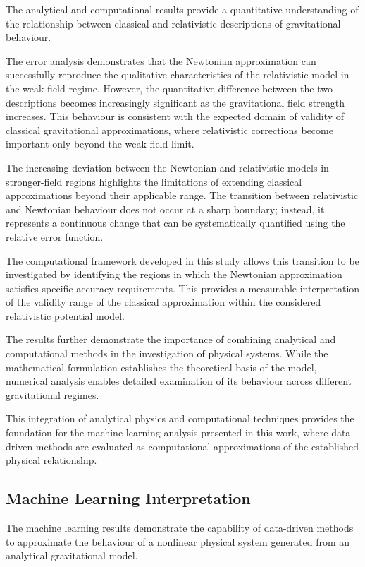 \documentclass[
]{article}
\begin{document}
The analytical and computational results provide a quantitative
understanding of the relationship between classical and relativistic
descriptions of gravitational behaviour.

The error analysis demonstrates that the Newtonian approximation can
successfully reproduce the qualitative characteristics of the
relativistic model in the weak-field regime. However, the quantitative
difference between the two descriptions becomes increasingly significant
as the gravitational field strength increases. This behaviour is
consistent with the expected domain of validity of classical
gravitational approximations, where relativistic corrections become
important only beyond the weak-field limit.

The increasing deviation between the Newtonian and relativistic models
in stronger-field regions highlights the limitations of extending
classical approximations beyond their applicable range. The transition
between relativistic and Newtonian behaviour does not occur at a sharp
boundary; instead, it represents a continuous change that can be
systematically quantified using the relative error function.

The computational framework developed in this study allows this
transition to be investigated by identifying the regions in which the
Newtonian approximation satisfies specific accuracy requirements. This
provides a measurable interpretation of the validity range of the
classical approximation within the considered relativistic potential
model.

The results further demonstrate the importance of combining analytical
and computational methods in the investigation of physical systems.
While the mathematical formulation establishes the theoretical basis of
the model, numerical analysis enables detailed examination of its
behaviour across different gravitational regimes.

This integration of analytical physics and computational techniques
provides the foundation for the machine learning analysis presented in
this work, where data-driven methods are evaluated as computational
approximations of the established physical relationship.

\subsection{Machine Learning Interpretation}\label{machine-learning-interpretation}

The machine learning results demonstrate the capability of data-driven
methods to approximate the behaviour of a nonlinear physical system
generated from an analytical gravitational model.
\end{document}
